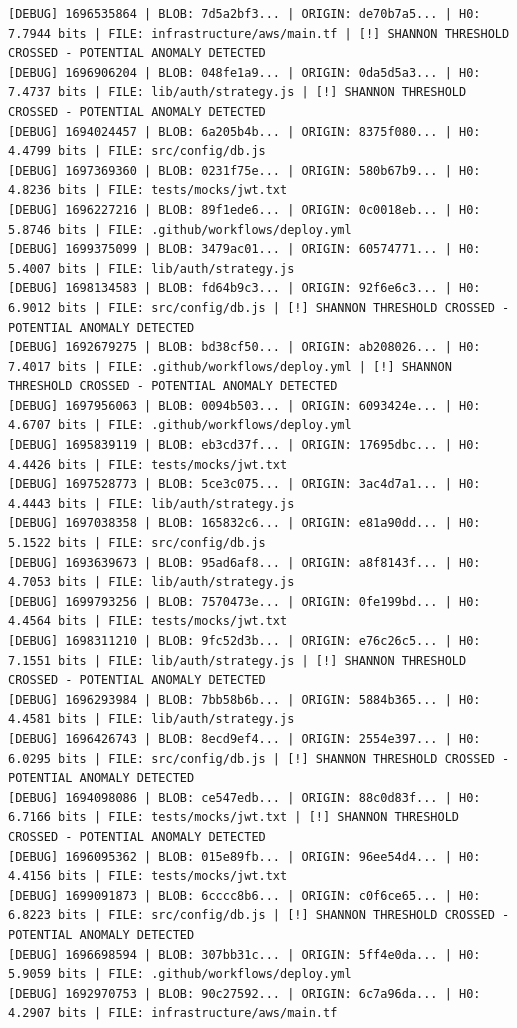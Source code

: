 \documentclass[12pt, a4paper, oneside]{report}
\begin{document}
\begin{lstlisting}[basicstyle=\tiny\ttfamily]
[DEBUG] 1696535864 | BLOB: 7d5a2bf3... | ORIGIN: de70b7a5... | H0: 7.7944 bits | FILE: infrastructure/aws/main.tf | [!] SHANNON THRESHOLD CROSSED - POTENTIAL ANOMALY DETECTED
[DEBUG] 1696906204 | BLOB: 048fe1a9... | ORIGIN: 0da5d5a3... | H0: 7.4737 bits | FILE: lib/auth/strategy.js | [!] SHANNON THRESHOLD CROSSED - POTENTIAL ANOMALY DETECTED
[DEBUG] 1694024457 | BLOB: 6a205b4b... | ORIGIN: 8375f080... | H0: 4.4799 bits | FILE: src/config/db.js
[DEBUG] 1697369360 | BLOB: 0231f75e... | ORIGIN: 580b67b9... | H0: 4.8236 bits | FILE: tests/mocks/jwt.txt
[DEBUG] 1696227216 | BLOB: 89f1ede6... | ORIGIN: 0c0018eb... | H0: 5.8746 bits | FILE: .github/workflows/deploy.yml
[DEBUG] 1699375099 | BLOB: 3479ac01... | ORIGIN: 60574771... | H0: 5.4007 bits | FILE: lib/auth/strategy.js
[DEBUG] 1698134583 | BLOB: fd64b9c3... | ORIGIN: 92f6e6c3... | H0: 6.9012 bits | FILE: src/config/db.js | [!] SHANNON THRESHOLD CROSSED - POTENTIAL ANOMALY DETECTED
[DEBUG] 1692679275 | BLOB: bd38cf50... | ORIGIN: ab208026... | H0: 7.4017 bits | FILE: .github/workflows/deploy.yml | [!] SHANNON THRESHOLD CROSSED - POTENTIAL ANOMALY DETECTED
[DEBUG] 1697956063 | BLOB: 0094b503... | ORIGIN: 6093424e... | H0: 4.6707 bits | FILE: .github/workflows/deploy.yml
[DEBUG] 1695839119 | BLOB: eb3cd37f... | ORIGIN: 17695dbc... | H0: 4.4426 bits | FILE: tests/mocks/jwt.txt
[DEBUG] 1697528773 | BLOB: 5ce3c075... | ORIGIN: 3ac4d7a1... | H0: 4.4443 bits | FILE: lib/auth/strategy.js
[DEBUG] 1697038358 | BLOB: 165832c6... | ORIGIN: e81a90dd... | H0: 5.1522 bits | FILE: src/config/db.js
[DEBUG] 1693639673 | BLOB: 95ad6af8... | ORIGIN: a8f8143f... | H0: 4.7053 bits | FILE: lib/auth/strategy.js
[DEBUG] 1699793256 | BLOB: 7570473e... | ORIGIN: 0fe199bd... | H0: 4.4564 bits | FILE: tests/mocks/jwt.txt
[DEBUG] 1698311210 | BLOB: 9fc52d3b... | ORIGIN: e76c26c5... | H0: 7.1551 bits | FILE: lib/auth/strategy.js | [!] SHANNON THRESHOLD CROSSED - POTENTIAL ANOMALY DETECTED
[DEBUG] 1696293984 | BLOB: 7bb58b6b... | ORIGIN: 5884b365... | H0: 4.4581 bits | FILE: lib/auth/strategy.js
[DEBUG] 1696426743 | BLOB: 8ecd9ef4... | ORIGIN: 2554e397... | H0: 6.0295 bits | FILE: src/config/db.js | [!] SHANNON THRESHOLD CROSSED - POTENTIAL ANOMALY DETECTED
[DEBUG] 1694098086 | BLOB: ce547edb... | ORIGIN: 88c0d83f... | H0: 6.7166 bits | FILE: tests/mocks/jwt.txt | [!] SHANNON THRESHOLD CROSSED - POTENTIAL ANOMALY DETECTED
[DEBUG] 1696095362 | BLOB: 015e89fb... | ORIGIN: 96ee54d4... | H0: 4.4156 bits | FILE: tests/mocks/jwt.txt
[DEBUG] 1699091873 | BLOB: 6cccc8b6... | ORIGIN: c0f6ce65... | H0: 6.8223 bits | FILE: src/config/db.js | [!] SHANNON THRESHOLD CROSSED - POTENTIAL ANOMALY DETECTED
[DEBUG] 1696698594 | BLOB: 307bb31c... | ORIGIN: 5ff4e0da... | H0: 5.9059 bits | FILE: .github/workflows/deploy.yml
[DEBUG] 1692970753 | BLOB: 90c27592... | ORIGIN: 6c7a96da... | H0: 4.2907 bits | FILE: infrastructure/aws/main.tf
\end{lstlisting}
\end{document}
